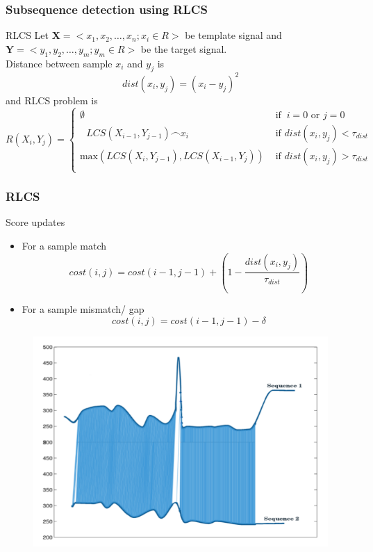 \documentclass{beamer}
\begin{document}
\begin{frame}

\frametitle{Subsequence detection using RLCS}
\begin{block}{RLCS}
Let $\bm{X} = < x_1, x_2,\hdots, x_n ; x_i \in R >$ be template signal and $\bm{Y} = <y_1, y_2, \hdots, y_m ; y_m \in R>$ be the target signal.\\
Distance between sample $x_i$ and $y_j$ is 
$$dist(x_i, y_j) =  (x_i - y_j)^2$$
and RLCS problem is
$$
R\left(X_{i},Y_{j}\right) =
\begin{cases}
  \emptyset
& \mbox{ if }\ i = 0 \mbox{ or }  j = 0 \\
  \textrm{  } LCS\left(X_{i-1},Y_{j-1}\right) \frown x_{i}
& \mbox{ if } dist(x_i , y_j) < \tau_{dist} \\
  \mbox{max}\left(LCS\left(X_{i},Y_{j-1}\right),LCS\left(X_{i-1},Y_{j}\right)\right)
& \mbox{ if } dist(x_i , y_j) > \tau_{dist} \\
\end{cases}
$$
\end{block}
\end{frame}
\begin{frame}
    \frametitle{RLCS}
    \begin{block}{Score updates}
    \begin{itemize}
        \item For a sample match
        $$cost(i, j) = cost(i-1, j-1) + (1 - \frac{dist(x_i, y_j)}{\tau_{dist}})$$
        \item For a sample mismatch/ gap
        $$cost(i, j) = cost(i-1, j-1) - \delta$$
    \end{itemize}        
    \end{block}
    \begin{figure}
    \includegraphics[width=0.35\linewidth]{img/rlcs.png}
    \end{figure}
\end{frame}
\end{document}
